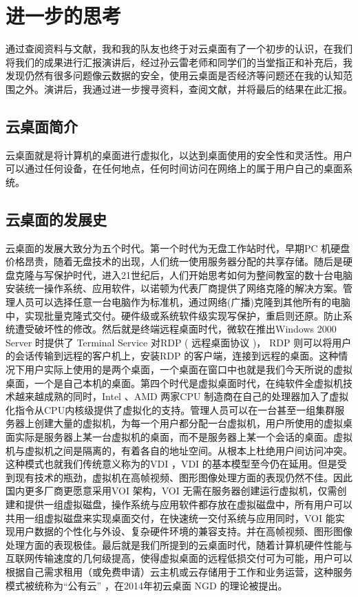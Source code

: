 \documentclass{article}
\begin{document}
\par

\section{进一步的思考}
通过查阅资料与文献，我和我的队友也终于对云桌面有了一个初步的认识，在我们将我们的成果进行汇报演讲后，经过孙云雷老师和同学们的当堂指正和补充后，我发现仍然有很多问题像云数据的安全，使用云桌面是否经济等问题还在我的认知范围之外。演讲后，我通过进一步搜寻资料，查阅文献，并将最后的结果在此汇报。\par


\subsection{云桌面简介}\par
云桌面就是将计算机的桌面进行虚拟化，以达到桌面使用的安全性和灵活性。用户可以通过任何设备，在任何地点，任何时间访问在网络上的属于用户自己的桌面系统。
\subsection{云桌面的发展史}\par
云桌面的发展大致分为五个时代。第一个时代为无盘工作站时代，早期PC 机硬盘价格昂贵，随着无盘技术的出现，人们统一使用服务器分配的共享存储。随后是硬盘克隆与写保护时代，进入21世纪后，人们开始思考如何为整间教室的数十台电脑安装统一操作系统、应用软件，以诺顿为代表厂商提供了网络克隆的解决方案。管理人员可以选择任意一台电脑作为标准机，通过网络(广播)克隆到其他所有的电脑中，实现批量克隆式交付。硬件级或系统软件级实现写保护，重启则还原。防止系统遭受破坏性的修改。然后就是终端远程桌面时代，微软在推出Windows 2000 Server 时提供了 Terminal Service 对RDP ( 远程桌面协议 )， RDP 则可以将用户的会话传输到远程的客户机上，安装RDP 的客户端，连接到远程的桌面。这种情况下用户实际上使用的是两个桌面，一个桌面在窗口中也就是我们今天所说的虚拟桌面，一个是自己本机的桌面。第四个时代是虚拟桌面时代，在纯软件全虚拟机技术越来越成熟的同时，Intel 、AMD 两家CPU 制造商在自己的处理器加入了虚拟化指令从CPU内核级提供了虚拟化的支持。管理人员可以在一台甚至一组集群服务器上创建大量的虚拟机，为每一个用户都分配一台虚拟机，用户所使用的虚拟桌面实际是服务器上某一台虚拟机的桌面，而不是服务器上某一个会话的桌面。虚拟机与虚拟机之间是隔离的，有着各自的地址空间。从根本上杜绝用户间访问冲突。这种模式也就我们传统意义称为的VDI ，VDI 的基本模型至今仍在延用。但是受到现有技术的瓶劲，虚拟机在高帧视频、图形图像处理方面的表现仍然不佳。因此国内更多厂商更愿意采用VOI 架构，VOI 无需在服务器创建运行虚拟机，仅需创建和提供一组虚拟磁盘，操作系统与应用软件都存放在虚拟磁盘中，所有用户可以共用一组虚拟磁盘来实现桌面交付，在快速统一交付系统与应用同时，VOI 能实现用户数据的个性化与外设、复杂硬件环境的兼容支持。并在高帧视频、图形图像处理方面的表现极佳。最后就是我们所提到的云桌面时代，随着计算机硬件性能与互联网传输速度的几何级提高，使得虚拟桌面的远程低损交付可为可能，用户可以根据自己需求租用（或免费申请）云主机或云存储用于工作和业务运营，这种服务模式被统称为“公有云” ，在2014年初云桌面 NGD 的理论被提出。
\end{document}
